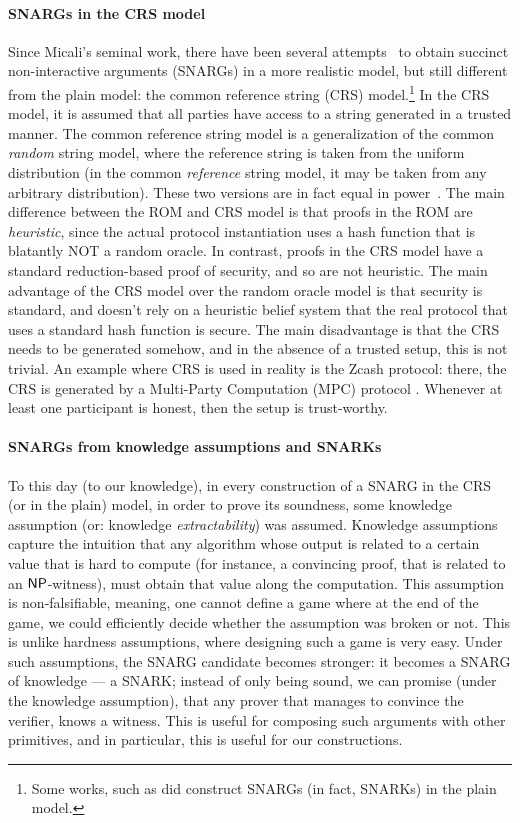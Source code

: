 \paragraph{SNARGs in the CRS model}
Since Micali's seminal work, there have been several attempts~\cite{aiello2000fast, dwork2004succinct, di2008succinct, groth2010short, bitansky2012extractable} to obtain succinct non-interactive arguments (SNARGs) in a more realistic model, but still different from the plain model: the common reference string (CRS) model.\footnote{
Some works, such as \cite{bitansky2013recursive} did construct SNARGs (in fact, SNARKs) in the plain model.
} In the CRS model, it is assumed that all parties have access to a string generated in a trusted manner. The common reference string model is a generalization of the common \emph{random} string model, where the reference string is taken from the uniform distribution (in the common \emph{reference} string model, it may be taken from any arbitrary distribution). These two versions are in fact equal in power~\cite{canetti2001universally}. The main difference between the ROM and CRS model is that proofs in the ROM are \emph{heuristic}, since the actual protocol instantiation uses a hash function that is blatantly NOT a random oracle. In contrast, proofs in the CRS model have a standard reduction-based proof of security, and so are not heuristic. The main advantage of the CRS model over the random oracle model is that security is standard, and doesn't rely on a heuristic belief system that the real protocol that uses a standard hash function is secure. The main disadvantage is that the CRS needs to be generated somehow, and in the absence of a trusted setup, this is not trivial. An example where CRS is used in reality is the Zcash protocol: there, the CRS is generated by a Multi-Party Computation (MPC) protocol \cite{crsZkSnark}. Whenever at least  one participant is honest, then the setup is trust-worthy.

\paragraph{SNARGs from knowledge assumptions and SNARKs}
To this day (to our knowledge), in every construction of a SNARG in the CRS (or in the plain) model, in order to prove its soundness, some knowledge assumption (or: knowledge \emph{extractability}) was assumed. Knowledge assumptions capture the intuition that any algorithm whose output is related to a certain value that is hard to compute (for instance, a convincing proof, that is related to an ${\mathsf{NP}}$-witness), must obtain that value along the computation. This assumption is non-falsifiable, meaning, one cannot define a game where at the end of the game, we could efficiently decide whether the assumption was broken or not. This is unlike hardness assumptions, where designing such a game is very easy.%
Under such assumptions, the SNARG candidate becomes stronger: it becomes a SNARG of knowledge --- a SNARK; instead of only being sound, we can promise (under the knowledge assumption), that any prover that manages to convince the verifier, knows a witness. This is useful for composing such arguments with other primitives, and in particular, this is useful for our constructions.

